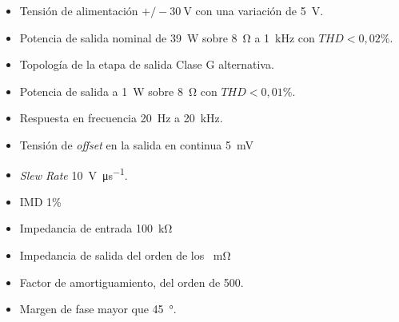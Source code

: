 

\begin{itemize}
	\item Tensión de alimentación $+/- \SI{30}{\volt}$ con una variación de \SI{5}{\volt}.
	\item Potencia de salida nominal de \SI{39}{\watt} sobre \SI{8}{\ohm} a \SI{1}{\kilo\hertz} con $THD<0,02\%$.
	\item Topología de la etapa de salida Clase G alternativa.
	\item Potencia de salida a \SI{1}{\watt} sobre \SI{8}{\ohm} con $THD<0,01\%$. 
	\item Respuesta en frecuencia \SI{20}{\hertz} a \SI{20}{\kilo\hertz}.
	\item Tensión de \textit{offset} en la salida en continua \SI{5}{\milli\volt}
	\item \textit{Slew Rate} \SI{10}{\volt\per\micro\second}.
	\item IMD 1\%
	\item Impedancia de entrada \SI{100}{\kilo\ohm}
	\item Impedancia de salida del orden de los \SI{}{\milli\ohm}
	\item Factor de amortiguamiento, del orden de 500.
	\item Margen de fase mayor que \SI{45}{\degree}.
\end{itemize}